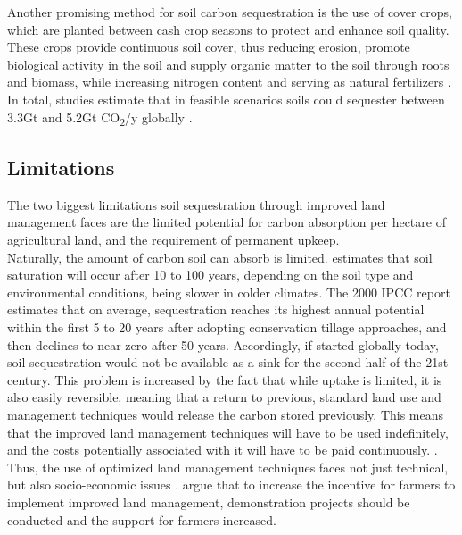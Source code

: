 Another promising method for soil carbon sequestration is the use of cover crops, which are planted between cash crop seasons to protect and enhance soil quality. These crops provide continuous soil cover, thus reducing erosion, promote biological activity in the soil and supply organic matter to the soil through roots and biomass, while increasing nitrogen content and serving as natural fertilizers \parencite{Ontl2012SoilStorage,Dipple2021TheSystems}.
In total, studies estimate that in feasible scenarios soils could sequester between 3.3Gt and 5.2Gt CO\textsubscript{2}/y globally \parencite{Bossio2020TheSolutions, Dipple2021TheSystems, NationalResearchCouncil2015ClimateSequestration}.

\subsection*{Limitations}
The two biggest limitations soil sequestration through improved land management faces are the limited potential for carbon absorption per hectare of agricultural land, and the requirement of permanent upkeep.\\ Naturally, the amount of carbon soil can absorb is limited. \textcite{Smith2016SoilTechnologies} estimates that soil saturation will occur after 10 to 100 years, depending on the soil type and environmental conditions, being slower in colder climates. The 2000 IPCC report estimates that on average, sequestration reaches its highest annual potential within the first 5 to 20 years after adopting conservation tillage approaches, and then declines to near-zero after 50 years. Accordingly, if started globally today, soil sequestration would not be available as a sink for the second half of the 21st century.  This problem is increased by the fact that while uptake is limited, it is also easily reversible, meaning that a return to previous, standard land use and management techniques would release the carbon stored previously. This means that the improved land management techniques will have to be used indefinitely, and the costs potentially associated with it will have to be paid continuously. \parencite[9]{Smith2016SoilTechnologies}.
Thus,  the use of optimized land management techniques faces not just technical, but also socio-economic issues \parencite{Dipple2021TheSystems}. \textcite{Zelikova2020LeadingAgriculture} argue that to increase the incentive for farmers to implement improved land management, demonstration projects should be conducted and the support for farmers increased.

